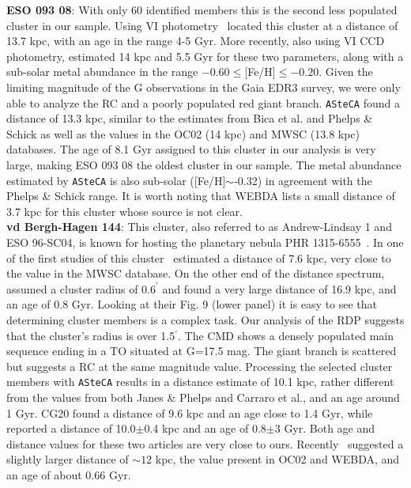 \documentclass[referee]{aa}
\begin{document}
\begin{appendix}
  \noindent \textbf{ESO 093 08}: With only 60 identified members this is the second less
  populated cluster in our sample. Using VI photometry~\cite{Bica_1999} located
  this cluster at a distance of 13.7 kpc, with an age in the range 4-5 Gyr.
  More recently, also using VI CCD photometry, \cite{Phelps_2003} estimated 14
  kpc and 5.5 Gyr for these two parameters, along with a sub-solar metal
  abundance in the range $-0.60\leq$[Fe/H]$\leq-0.20$.
  Given the limiting magnitude of the G observations in the Gaia EDR3 survey, we
  were only able to analyze the RC and a poorly populated red giant branch.
  \texttt{ASteCA} found a distance of 13.3 kpc, similar to the estimates from
  Bica et al. and Phelps \& Schick as well as the values in the OC02 (14 kpc)
  and MWSC (13.8 kpc) databases.
  The age of 8.1 Gyr assigned to this cluster in our analysis is very
  large, making ESO 093 08 the oldest cluster in our sample. The metal
  abundance estimated by \texttt{ASteCA} is also sub-solar ([Fe/H]$\sim$-0.32)
  in agreement with the Phelps \& Schick range. It is worth noting that WEBDA
  lists a small distance of 3.7 kpc for this cluster whose source is not
  clear.\\

  \noindent \textbf{vd Bergh-Hagen 144}: This cluster, also referred to as Andrew-Lindsay
  1 and ESO 96-SC04, is known for hosting the planetary nebula PHR
  1315-6555~\citep{Parker_2011}.
  In one of the first studies of this cluster~\cite{Janes_1994} estimated a
  distance of 7.6 kpc, very close to the value in the MWSC database. On the
  other end of the distance spectrum,
  \cite{Carraro_2005_neglected} assumed a cluster radius of $0.6^{\prime}$ and
  found a very large distance of 16.9 kpc, and an age of 0.8 Gyr. Looking at
  their Fig. 9 (lower panel) it is easy to see that determining cluster members
  is a complex task. Our analysis of the RDP suggests that the cluster's radius
  is over 1.5$^{\prime}$. The CMD shows a densely populated main sequence ending
  in a TO situated at G=17.5 mag. The giant branch is scattered but suggests a
  RC at the same magnitude value.
  Processing the selected cluster members with \texttt{ASteCA} results in a
  distance estimate of 10.1 kpc, rather different from the values
  from both Janes \& Phelps and Carraro et al., and an age around 1 Gyr.
  CG20 found a distance of 9.6 kpc and an age close to 1.4 Gyr,
  while~\cite{Majaess_2014} reported a distance of 10.0$\pm$0.4 kpc and an
  age of 0.8$\pm$3 Gyr. Both age and distance values for these two articles are
  very close to ours. Recently~\cite{Fragkou_2019} suggested a slightly larger
  distance of $\sim12$ kpc, the value present in OC02 and WEBDA, and an age of
  about 0.66 Gyr.\\


\end{appendix}
\end{document}
